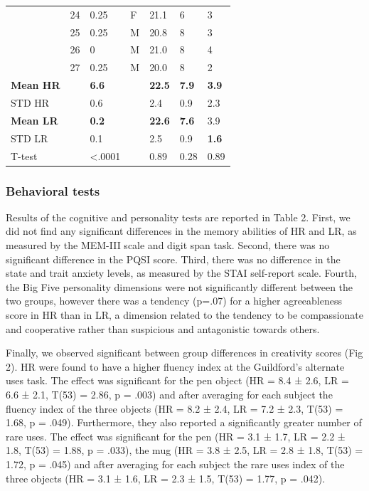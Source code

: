 \begin{longtable}{@{\extracolsep{\fill}}lllllll@{}}
	               	& 24 & 0.25           & F      & 21.1 			& 6             	& 3               \\
	               	& 25 & 0.25           & M      & 20.8 			& 8             	& 3               \\
	               	& 26 & 0              & M      & 21.0 			& 8             	& 4               \\
	               	& 27 & 0.25           & M      & 20.0 			& 8            		& 2               \\
	\textbf{Mean HR}&  	 & \textbf{6.6}   &        & \textbf{22.5} 	& \textbf{7.9} 		& \textbf{3.9}    \\
	STD HR         	&    & 0.6            &        & 2.4  			& 0.9          		& 2.3             \\
	\textbf{Mean LR}&    & \textbf{0.2}   &        & \textbf{22.6} 	& \textbf{7.6} 		& 3.9             \\
	STD LR         	&    & 0.1            &        & 2.5  			& 0.9          		& \textbf{1.6}    \\
	T-test         	&    & \textless.0001 &        & 0.89 			& 0.28         		& 0.89            \\ \bottomrule
\end{longtable}

\renewcommand{\arraystretch}{1.2}

\subsubsection*{Behavioral tests}
Results of the cognitive and personality tests are reported in Table 2. First, we did not find any significant differences in the memory abilities of HR and LR, as measured by the MEM-III scale and digit span task. Second, there was no significant difference in the PQSI score. Third, there was no difference in the state and trait anxiety levels, as measured by the STAI self-report scale. Fourth, the Big Five personality dimensions were not significantly different between the two groups, however there was a tendency (p=.07) for a higher agreeableness score in HR than in LR, a dimension related to the tendency to be compassionate and cooperative rather than suspicious and antagonistic towards others.

Finally, we observed significant between group differences in creativity scores (Fig 2). HR were found to have a higher fluency index at the Guildford’s alternate uses task. The effect was significant for the pen object (HR = 8.4 ± 2.6, LR = 6.6 ± 2.1, T(53) = 2.86, p = .003) and after averaging for each subject the fluency index of the three objects (HR = 8.2 ± 2.4, LR = 7.2 ± 2.3, T(53) = 1.68, p = .049). Furthermore, they also reported a significantly greater number of rare uses. The effect was significant for the pen (HR = 3.1 ± 1.7, LR = 2.2 ± 1.8, T(53) = 1.88, p = .033), the mug (HR = 3.8 ± 2.5, LR = 2.8 ± 1.8, T(53) = 1.72, p = .045) and after averaging for each subject the rare uses index of the three objects (HR = 3.1 ± 1.6, LR = 2.3 ± 1.5, T(53) = 1.77, p = .042).

